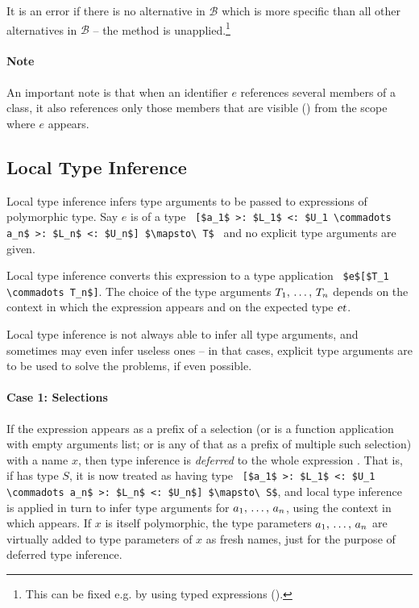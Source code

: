 It is an error if there is no alternative in $\mathcal{B}$ which is more specific than all other alternatives in $\mathcal{B}$ -- the method is unapplied.\footnote{This can be fixed e.g. by using typed expressions ().}

\paragraph{Note}
An important note is that when an identifier $e$ references several members of a class, it also references only those members that are visible () from the scope where $e$ appears. 








\subsection{Local Type Inference}
\label{sec:local-type-inference}

Local type inference infers type arguments to be passed to expressions of polymorphic type. Say $e$ is of a type ~\lstinline![$a_1$ >: $L_1$ <: $U_1 \commadots a_n$ >: $L_n$ <: $U_n$] $\mapsto\ T$!~ and no explicit type arguments are given. 

Local type inference converts this expression to a type application ~\lstinline!$e$[$T_1 \commadots T_n$]!. The choice of the type arguments $T_1 ,\, \ldots ,\, T_n$ depends on the context in which the expression appears and on the expected type $\mbox{\sl et}$. 

Local type inference is not always able to infer all type arguments, and sometimes may even infer useless ones -- in that cases, explicit type arguments are to be used to solve the problems, if even possible. 

\paragraph{Case 1: Selections}
If the expression appears as a prefix of a selection (or is a function application with empty arguments list; or is any of that as a prefix of multiple such selection) with a name $x$, then type inference is {\em deferred} to the whole expression . That is, if  has type $S$, it is now treated as having type ~\lstinline![$a_1$ >: $L_1$ <: $U_1 \commadots a_n$ >: $L_n$ <: $U_n$] $\mapsto\ S$!, and local type inference is applied in turn to infer type arguments for $a_1 ,\, \ldots ,\, a_n$, using the context in which  appears. If $x$ is itself polymorphic, the type parameters $a_1 ,\, \ldots ,\, a_n$ are virtually added to type parameters of $x$ as fresh names, just for the purpose of deferred type inference. 

